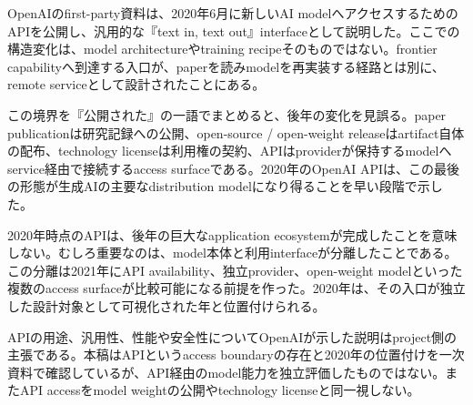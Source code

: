 
OpenAIのfirst-party資料は、2020年6月に新しいAI modelへアクセスするためのAPIを公開し、汎用的な『text in, text out』interfaceとして説明した。ここでの構造変化は、model architectureやtraining recipeそのものではない。frontier capabilityへ到達する入口が、paperを読みmodelを再実装する経路とは別に、remote serviceとして設計されたことにある。\autocite{src-3b6a4c260e20}


この境界を『公開された』の一語でまとめると、後年の変化を見誤る。paper publicationは研究記録への公開、open-source / open-weight releaseはartifact自体の配布、technology licenseは利用権の契約、APIはproviderが保持するmodelへservice経由で接続するaccess surfaceである。2020年のOpenAI APIは、この最後の形態が生成AIの主要なdistribution modelになり得ることを早い段階で示した。\autocite{src-3b6a4c260e20}


2020年時点のAPIは、後年の巨大なapplication ecosystemが完成したことを意味しない。むしろ重要なのは、model本体と利用interfaceが分離したことである。この分離は2021年にAPI availability、独立provider、open-weight modelといった複数のaccess surfaceが比較可能になる前提を作った。2020年は、その入口が独立した設計対象として可視化された年と位置付けられる。\autocite{src-3b6a4c260e20}


\begin{claimboundary}
APIの用途、汎用性、性能や安全性についてOpenAIが示した説明はproject側の主張である。本稿はAPIというaccess boundaryの存在と2020年の位置付けを一次資料で確認しているが、API経由のmodel能力を独立評価したものではない。またAPI accessをmodel weightの公開やtechnology licenseと同一視しない。\autocite{src-3b6a4c260e20}
\end{claimboundary}
